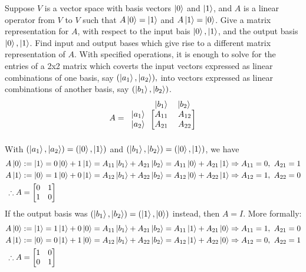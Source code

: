  Suppose $V$ is a vector space with basis vectors $\ket{0}$ and $\ket{1}$, and $A$ is a linear operator
from $V$ to $V$ such that $A\ket{0}=\ket{1}$ and $A\ket{1}=\ket{0}$.  Give a matrix representation for $A$, with
respect to the input bais $\ket{0},\ket{1}$, and the output basis $\ket{0},\ket{1}$.  Find input and output bases which
give rise to a different matrix representation of $A$.
\Soln With specified operations, it is enough to solve for the entries of a 2x2 matrix which
coverts the input vectors expressed as linear combinations of one basis, say $(\ket{a_1},\ket{a_2}),$
into vectors expressed as linear combinations of another basis, say $(\ket{b_1},\ket{b_2})$.
\[
A = \begin{blockarray}{ccc}
\begin{block}{ccc}
& \ket{b_1} & \ket{b_2}\\
    \end{block}
\begin{block}{ c[cc] }
\ket{a_1} & A_{11} & A_{12} \\
\ket{a_2} & A_{21} & A_{22} \\
            \end{block}
        \end{blockarray}
\]
With $(\ket{a_1},\ket{a_2}) = (\ket{0},\ket{1})$ and $(\ket{b_1},\ket{b_2}) = (\ket{0},\ket{1})$, we have
\begin{align*}
	A\ket{0} &:= \ket{1} = 0\ket{0}+1\ket{1}= A_{11}\ket{b_1} + A_{21}\ket{b_2} = A_{11}\ket{0} + A_{21}\ket{1}\Rightarrow A_{11} = 0,\ A_{21} = 1\\
	A\ket{1} &:= \ket{0} = 1\ket{0}+0\ket{1}=A_{12}\ket{b_1} + A_{22}\ket{b_2} = A_{12}\ket{0} + A_{22}\ket{1}\Rightarrow A_{12} = 1,\ A_{22} = 0\\
%
	\therefore A &=
	\begin{bmatrix}
		0 & 1 \\
		1 & 0
	\end{bmatrix}
\end{align*}
If the output basis was $(\ket{b_1},\ket{b_2}) = (\ket{1},\ket{0})$ instead, then $A=I$.  More formally:
\begin{align*}
    A\ket{0} &:= \ket{1} = 1\ket{1}+0\ket{0}= A_{11}\ket{b_1} + A_{21}\ket{b_2} = A_{11}\ket{1} + A_{21}\ket{0}\Rightarrow A_{11} = 1,\ A_{21} = 0\\
    A\ket{1} &:= \ket{0} = 0\ket{1}+1\ket{0}= A_{12}\ket{b_1} + A_{22}\ket{b_2} = A_{12}\ket{1} + A_{22}\ket{0}\Rightarrow A_{12} = 0,\ A_{22} = 1\\
    \therefore A &=
    \begin{bmatrix}
    1 & 0 \\
    0 & 1
    \end{bmatrix}
\end{align*}
